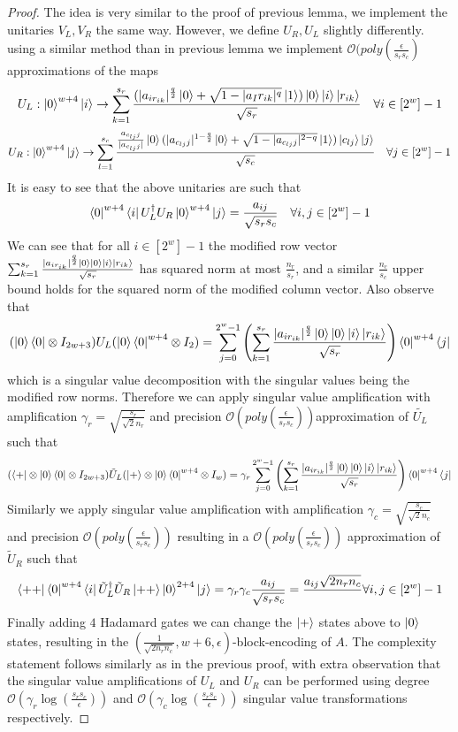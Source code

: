 \documentclass[12pt, oneside]{book}
\theoremstyle{definition}
\theoremstyle{definition}
\theoremstyle{remark}
\begin{document}
\begin{proof}
    The idea is very similar to the proof of previous lemma, we implement the unitaries $V_L,V_R$ the same way. However, we define $U_R,U_L$ slightly differently. using a similar method than in previous lemma we implement $\mathcal{O}(poly(\frac{\epsilon}{s_rs_c})$ approximations of the maps
    \[
    U_L:\ket{0}^{w+4}\ket{i}\rightarrow \sum_{k=1}^{s_r} \frac{(|a_{ir_{ik}}|^{\frac{q}{2}}\ket{0}+\sqrt{1-|a_Ir_{ik}|^q}\ket{1})\ket{0}\ket{i}\ket{r_{ik}}}{\sqrt{s_r}}\quad \forall i\in[2^w]-1
    \]
    \[
    U_R:\ket{0}^{w+4}\ket{j}\rightarrow \sum_{l=1}^{s_c}\frac{\frac{a_{c_{lj}j}}{|a_{c_{lj}j}|}\ket{0}(|a_{c_{lj}j}|^{1-\frac{q}{2}}\ket{0}+\sqrt{1-|a_{c_{lj}j}|^{2-q}}\ket{1})\ket{c_{lj}}\ket{j}}{\sqrt{s_c}}\quad \forall j \in [2^w]-1
    \]
    It is easy to see that the above unitaries are such that
    \[
\bra{0}^{w+4}\bra{i}U_L^{\dagger}U_R\ket{0}^{w+4}\ket{j}=\frac{a_{ij}}{\sqrt{s_rs_c}}\quad \forall i,j \in [2^w]-1
    \]
    We can see that for all $i\in[2^w]-1$ the modified row vector $\sum_{k=1}^{s_r}\frac{|a_{ir_{ik}}|^{\frac{q}{2}}\ket{0}\ket{0}\ket{i}\ket{r_{ik}}}{\sqrt{s_r}}$ has squared norm at most $\frac{n_r}{s_r}$, and a similar $\frac{n_c}{s_c}$ upper bound holds for the squared norm of the modified column vector. Also observe that
    \[
    (\ket{0}\bra{0}\otimes I_{2w+3})U_L(\ket{0}\bra{0}^{w+4} \otimes I_2)=\sum_{j=0}^{2^w-1}\left(\sum_{k=1}^{s_r}\frac{|a_{ir_{ik}}|^{\frac{q}{2}}\ket{0}\ket{0}\ket{i}\ket{r_{ik}}}{\sqrt{s_r}}\right)\bra{0}^{w+4}\bra{j}
    \]
    which is a singular value decomposition with the singular values being the modified row norms. Therefore we can apply singular value amplification with amplification $\gamma_r=\sqrt{\frac{s_r}{\sqrt{2}n_r}}$ and precision $\mathcal{O}(poly\left(\frac{\epsilon}{s_rs_c}\right))$approximation of $\tilde{U_L}$ such that 
    \[
    (\bra{+}\otimes \ket{0}\bra{0}\otimes I_{2w+3})\tilde{U}_L (\ket{+}\otimes \ket{0}\bra{0}^{w+4}\otimes I_w)=\gamma_r \sum_{j=0}^{2^w-1}\left(\sum_{k=1}^{s_r}\frac{|a_{ir_{ik}}|^{\frac{q}{2}}\ket{0}\ket{0}\ket{i}\ket{r_{ik}}}{\sqrt{s_r}}\right)\bra{0}^{w+4}\bra{j}
    \]
    Similarly we apply singular value amplification with amplification $\gamma_c=\sqrt{\frac{s_c}{\sqrt{2}n_c}}$ and precision $\mathcal{O}(poly(\frac{\epsilon}{s_rs_c}))$ resulting in a $\mathcal{O}(poly(\frac{\epsilon}{s_rs_c}))$ approximation of $\tilde{U}_R$ such that
    \[
    \bra{++}\bra{0}^{w+4}\bra{i}\tilde{U}_L^{\dagger}\tilde{U}_R\ket{++}\ket{0}^{2+4}\ket{j}=\gamma_r\gamma_c \frac{a_{ij}}{\sqrt{s_rs_c}}=\frac{a_{ij}{\sqrt{2n_rn_c}}}\quad \forall i,j\in[2^w]-1
    \]
    Finally adding $4$ Hadamard gates we can change the $\ket{+}$ states above to $\ket{0}$ states, resulting in the $\left(\frac{1}{\sqrt{2n_rn_c}},w+6,\epsilon\right)$-block-encoding of $A$. The complexity statement follows similarly as in the previous proof, with extra observation that the singular value amplifications of $U_L$ and $U_R$ can be performed using degree $\mathcal{O}(\gamma_r \log(\frac{s_rs_c}{\epsilon}))$ and $\mathcal{O}(\gamma_c\log(\frac{s_rs_c}{\epsilon}))$ singular value transformations respectively.
\end{proof}
\end{document}
